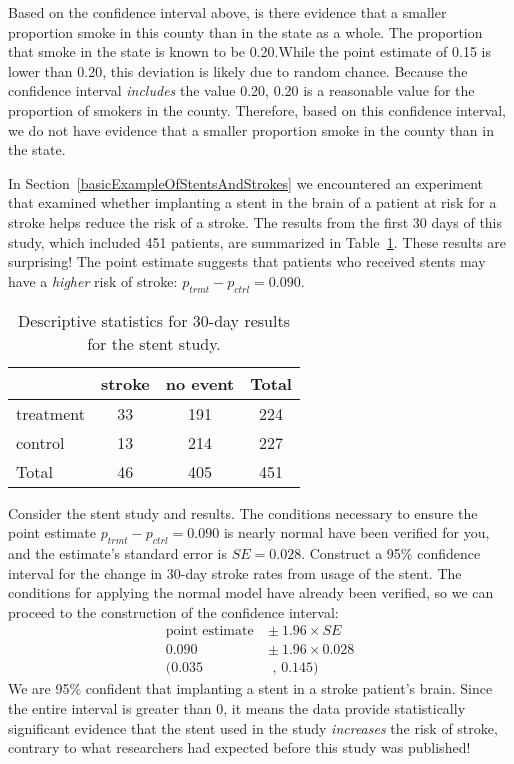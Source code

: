 \begin{example}{Based on the confidence interval above, is there evidence that a smaller proportion smoke in this county than in the state as a whole.  The proportion that smoke in the state is known to be 0.20.}While the point estimate of 0.15 is lower than 0.20, this deviation is likely due to random chance.  Because the confidence interval \emph{includes} the value 0.20, 0.20 is a reasonable value for the proportion of smokers in the county.  Therefore, based on this confidence interval, we do not have evidence that a smaller proportion smoke in the county than in the state.
\end{example}

In Section~\ref{basicExampleOfStentsAndStrokes} we encountered an experiment that examined whether implanting a stent in the brain of a patient at risk for a stroke helps reduce the risk of a stroke. The results from the first 30 days of this study, which included 451 patients, are summarized in Table~\ref{stentStudyResultsCIsection}. These results are surprising! The point estimate suggests that patients who received stents may have a \emph{higher} risk of stroke: $p_{trmt} - p_{ctrl} = 0.090$.

\begin{table}[h]
\centering
\begin{tabular}{l cc c}
  \hline
	& 	stroke 	& no event & Total \\
  \hline
treatment 	& 33		& 191	& 224 \\
control 	& 13		& 214	& 227 \\
  \hline
Total		& 46		& 405	& 451 \\
  \hline
\end{tabular}
\caption{Descriptive statistics for 30-day results for the stent study.}
\label{stentStudyResultsCIsection}
\end{table}

\begin{example}{Consider the stent study and results. The conditions necessary to ensure the point estimate $p_{trmt} - p_{ctrl} = 0.090$ is nearly normal have been verified for you, and the estimate's standard error is $SE = 0.028$. Construct a 95\% confidence interval for the change in 30-day stroke rates from usage of the stent.}
\label{stentStroke95CI_CIsection}
The conditions for applying the normal model have already been verified, so we can proceed to the construction of the confidence interval:
\begin{align*}
\text{point estimate}\ &\pm \ 1.96\times SE \\
0.090\ &\pm \ 1.96 \times 0.028 \\
(0.035&\text{ , } 0.145)
\end{align*}
We are 95\% confident that implanting a stent in a stroke patient's brain.  Since the entire interval is greater than 0, it means the data provide statistically significant evidence that the stent used in the study \emph{increases} the risk of stroke, contrary to what researchers had expected before this study was published!
\end{example}

